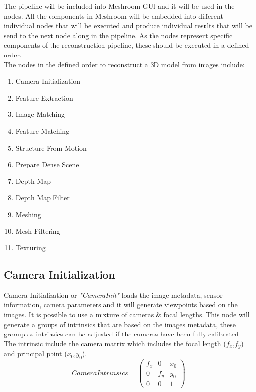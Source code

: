 \documentclass[12pt]{report}
\begin{document}
The pipeline will be included into Meshroom GUI and it will be used in the nodes. All the components in Meshroom will be embedded into different individual nodes that will be executed and produce individual results that will be send to the next node along in the pipeline.
As the nodes represent specific components of the reconstruction pipeline, these should be executed in a defined order.\\
The nodes in the defined order to reconstruct a 3D model from images include:
\begin{enumerate}
  \itemsep0em 
  \item Camera Initialization 
  \item Feature Extraction
  \item Image Matching
  \item Feature Matching
  \item Structure From Motion
  \item Prepare Dense Scene
  \item Depth Map
  \item Depth Map Filter
  \item Meshing
  \item Mesh Filtering
  \item Texturing
\end{enumerate}

\subsection{Camera Initialization}
Camera Initialization or \textit{"CameraInit"} loads the image metadata, sensor information, camera parameters and it will  generate viewpoints based on the images.
It is possible to use a mixture of cameras \& focal lengths. This node will generate a groups of intrinsics that are based on the images metadata, these grooup os intrinsics can be adjusted if the cameras have been fully calibrated.
The intrinsic include the camera matrix  which includes the focal length ($f_x$,$f_y$) and principal point ($x_0$,$y_0$).
\begin{equation*}
  Camera Intrinsics = 
  \begin{pmatrix}
  f_x & 0 & x_0 \\
  0 & f_y & y_0 \\
  0 & 0 & 1
  \end{pmatrix}
\end{equation*}
\label{equ:camera_intrisics}
\end{document}
